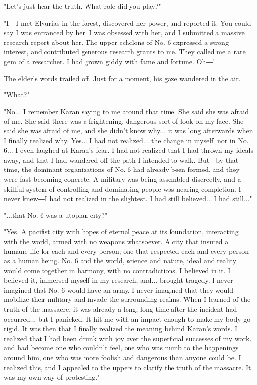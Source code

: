 "Let's just hear the truth. What role did you play?"

"I―I met Elyurias in the forest, discovered her power, and reported it.
You could say I was entranced by her. I was obsessed with her, and I
submitted a massive research report about her. The upper echelons of No.
6 expressed a strong interest, and contributed generous research grants
to me. They called me a rare gem of a researcher. I had grown giddy with
fame and fortune. Oh―"

The elder's words trailed off. Just for a moment, his gaze wandered in
the air.

"What?"

"No... I remember Karan saying to me around that time. She said she was
afraid of me. She said there was a frightening, dangerous sort of look
on my face. She said she was afraid of me, and she didn't know why... it
was long afterwards when I finally realized why. Yes... I had not
realized... the change in myself, nor in No. 6... I even laughed at
Karan's fear. I had not realized that I had thrown my ideals away, and
that I had wandered off the path I intended to walk. But―by that time,
the dominant organizations of No. 6 had already been formed, and they
were fast becoming concrete. A military was being assembled discreetly,
and a skillful system of controlling and dominating people was nearing
completion. I never knew―I had not realized in the slightest. I had
still believed... I had still..."

"...that No. 6 was a utopian city?"

"Yes. A pacifist city with hopes of eternal peace at its foundation,
interacting with the world, armed with no weapons whatsoever. A city
that insured a humane life for each and every person; one that respected
each and every person as a human being. No. 6 and the world, science and
nature, ideal and reality would come together in harmony, with no
contradictions. I believed in it. I believed it, immersed myself in my
research, and... brought tragedy. I never imagined that No. 6 would have
an army. I never imagined that they would mobilize their military and
invade the surrounding realms. When I learned of the truth of the
massacre, it was already a long, long time after the incident had
occurred... but I panicked. It hit me with an impact enough to make my
body go rigid. It was then that I finally realized the meaning behind
Karan's words. I realized that I had been drunk with joy over the
superficial successes of my work, and had become one who couldn't feel,
one who was numb to the happenings around him, one who was more foolish
and dangerous than anyone could be. I realized this, and I appealed to
the uppers to clarify the truth of the massacre. It was my own way of
protesting."

